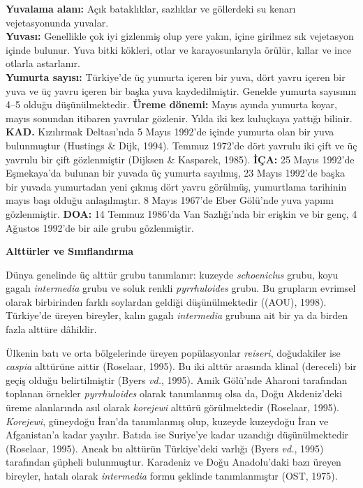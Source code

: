 \documentclass[
  10.5pt,
  a4paper,
  DIV=11,
  numbers=noendperiod,
  twocolumn]{scrreprt}
\begin{document}
\textbf{Yuvalama alanı:} Açık bataklıklar, sazlıklar ve göllerdeki su
kenarı vejetasyonunda yuvalar.\\
\textbf{Yuvası:} Genellikle çok iyi gizlenmiş olup yere yakın, içine
girilmez sık vejetasyon içinde bulunur. Yuva bitki kökleri, otlar ve
karayosunlarıyla örülür, kıllar ve ince otlarla astarlanır.\\
\textbf{Yumurta sayısı:} Türkiye'de üç yumurta içeren bir yuva, dört
yavru içeren bir yuva ve üç yavru içeren bir başka yuva kaydedilmiştir.
Genelde yumurta sayısının 4--5 olduğu düşünülmektedir. \textbf{Üreme
dönemi:} Mayıs ayında yumurta koyar, mayıs sonundan itibaren yavrular
gözlenir. Yılda iki kez kuluçkaya yattığı bilinir. \textbf{KAD.}
Kızılırmak Deltası'nda 5 Mayıs 1992'de içinde yumurta olan bir yuva
bulunmuştur (Hustings \& Dijk, 1994). Temmuz 1972'de dört yavrulu iki
çift ve üç yavrulu bir çift gözlenmiştir (Dijksen \& Kasparek, 1985).
\textbf{İÇA:} 25 Mayıs 1992'de Eşmekaya'da bulunan bir yuvada üç yumurta
sayılmış, 23 Mayıs 1992'de başka bir yuvada yumurtadan yeni çıkmış dört
yavru görülmüş, yumurtlama tarihinin mayıs başı olduğu anlaşılmıştır. 8
Mayıs 1967'de Eber Gölü'nde yuva yapımı gözlenmiştir. \textbf{DOA:} 14
Temmuz 1986'da Van Sazlığı'nda bir erişkin ve bir genç, 4 Ağustos
1992'de bir aile grubu gözlenmiştir.

\textbf{Alttürler ve Sınıflandırma}

Dünya genelinde üç alttür grubu tanımlanır: kuzeyde \emph{schoeniclus}
grubu, koyu gagalı \emph{intermedia} grubu ve soluk renkli
\emph{pyrrhuloides} grubu. Bu grupların evrimsel olarak birbirinden
farklı soylardan geldiği düşünülmektedir ((AOU), 1998). Türkiye'de
üreyen bireyler, kalın gagalı \emph{intermedia} grubuna ait bir ya da
birden fazla alttüre dâhildir.

Ülkenin batı ve orta bölgelerinde üreyen popülasyonlar \emph{reiseri},
doğudakiler ise \emph{caspia} alttürüne aittir (Roselaar, 1995). Bu iki
alttür arasında klinal (dereceli) bir geçiş olduğu belirtilmiştir (Byers
\emph{vd.}, 1995). Amik Gölü'nde Aharoni tarafından toplanan örnekler
\emph{pyrrhuloides} olarak tanımlanmış olsa da, Doğu Akdeniz'deki üreme
alanlarında asıl olarak \emph{korejewi} alttürü görülmektedir (Roselaar,
1995). \emph{Korejewi}, güneydoğu İran'da tanımlanmış olup, kuzeyde
kuzeydoğu İran ve Afganistan'a kadar yayılır. Batıda ise Suriye'ye kadar
uzandığı düşünülmektedir (Roselaar, 1995). Ancak bu alttürün
Türkiye'deki varlığı (Byers \emph{vd.}, 1995) tarafından şüpheli
bulunmuştur. Karadeniz ve Doğu Anadolu'daki bazı üreyen bireyler, hatalı
olarak \emph{intermedia} formu şeklinde tanımlanmıştır (OST, 1975).
\end{document}
